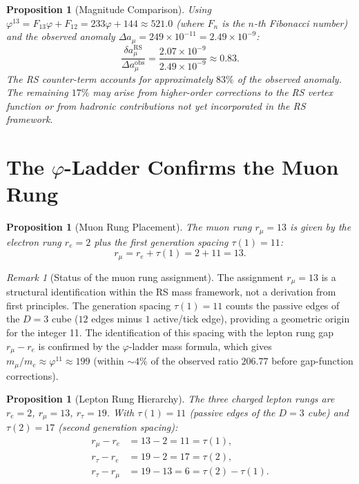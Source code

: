 \documentclass[12pt,a4paper]{article}
\newtheorem{proposition}[theorem]{Proposition}
\theoremstyle{definition}
\theoremstyle{remark}
\newtheorem{remark}[theorem]{Remark}
\begin{document}
\begin{proposition}[Magnitude Comparison]
\label{prop:magnitude}
Using $\varphi^{13} = F_{13}\varphi + F_{12} = 233\varphi + 144
\approx 521.0$ (where $F_n$ is the $n$-th Fibonacci number) and the
observed anomaly $\Delta a_\mu = 249 \times 10^{-11} = 2.49 \times 10^{-9}$:
\begin{equation}
  \frac{\delta a_\mu^{\mathrm{RS}}}{\Delta a_\mu^{\mathrm{obs}}}
  = \frac{2.07 \times 10^{-9}}{2.49 \times 10^{-9}} \approx 0.83.
\end{equation}
The RS counter-term accounts for approximately $83\%$ of the observed
anomaly.  The remaining $17\%$ may arise from higher-order corrections
to the RS vertex function or from hadronic contributions not yet
incorporated in the RS framework.
\end{proposition}

\section{The $\varphi$-Ladder Confirms the Muon Rung}
\label{sec:rung}

\begin{proposition}[Muon Rung Placement]
\label{thm:rung}
The muon rung $r_\mu = 13$ is given by the electron rung
$r_e = 2$ plus the first generation spacing $\tau(1) = 11$:
\begin{equation}
  r_\mu = r_e + \tau(1) = 2 + 11 = 13.
\end{equation}
\end{proposition}

\begin{remark}[Status of the muon rung assignment]
The assignment $r_\mu = 13$ is a structural identification within the
RS mass framework, not a derivation from first principles.  The
generation spacing $\tau(1) = 11$ counts the passive edges of the
$D = 3$ cube ($12$ edges minus $1$ active/tick edge), providing a
geometric origin for the integer 11.  The identification of this
spacing with the lepton rung gap $r_\mu - r_e$ is confirmed by the
$\varphi$-ladder mass formula, which gives $m_\mu/m_e \approx \varphi^{11}
\approx 199$ (within $\sim 4\%$ of the observed ratio $206.77$ before
gap-function corrections).
\end{remark}

\begin{proposition}[Lepton Rung Hierarchy]
\label{prop:lepton-rungs}
The three charged lepton rungs are $r_e = 2$, $r_\mu = 13$, $r_\tau = 19$.
With $\tau(1) = 11$ (passive edges of the $D=3$ cube) and $\tau(2) = 17$
(second generation spacing):
\begin{align*}
  r_\mu - r_e &= 13 - 2 = 11 = \tau(1), \\
  r_\tau - r_e &= 19 - 2 = 17 = \tau(2), \\
  r_\tau - r_\mu &= 19 - 13 = 6 = \tau(2) - \tau(1).
\end{align*}
\end{proposition}
\end{document}
